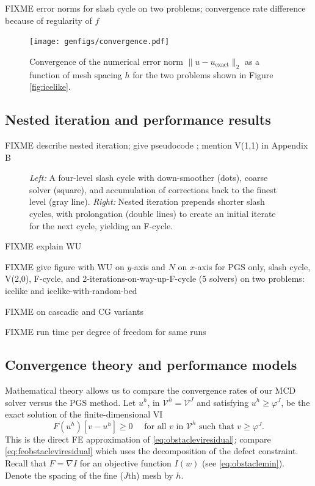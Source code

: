 \documentclass[letterpaper,final,12pt,reqno]{amsart}
\theoremstyle{claim}
\newcommand{\grad}{\nabla}
\numberwithin{equation}{section}
\numberwithin{figure}{section}
\numberwithin{table}{section}
\numberwithin{theorem}{section}
\begin{document}
FIXME error norms for slash cycle on two problems; convergence rate difference because of regularity of $f$

\begin{figure}
\texttt{[image: genfigs/convergence.pdf]}
\caption{Convergence of the numerical error norm $\|u-u_{\text{exact}}\|_2$ as a function of mesh spacing $h$ for the two problems shown in Figure \ref{fig:icelike}.}
\label{fig:convergence}
\end{figure}


\subsection*{Nested iteration and performance results} FIXME describe nested iteration; give pseudocode ; mention V(1,1) in Appendix B

\begin{figure}

\caption{\emph{Left:} A four-level slash cycle with down-smoother (dots), coarse solver (square), and accumulation of corrections back to the finest level (gray line).  \emph{Right:} Nested iteration prepends shorter slash cycles, with prolongation (double lines) to create an initial iterate for the next cycle, yielding an F-cycle.}
\label{fig:fcycle}
\end{figure}

FIXME explain WU

FIXME give figure with WU on $y$-axis and $N$ on $x$-axis for PGS only, slash cycle, V(2,0), F-cycle, and 2-iterations-on-way-up-F-cycle (5 solvers) on two problems: icelike and icelike-with-random-bed

FIXME \cite{Blumetal2004} on cascadic and CG variants

FIXME run time per degree of freedom for same runs

\subsection*{Convergence theory and performance models}  Mathematical theory allows us to compare the convergence rates of our MCD solver versus the PGS method.  Let $u^h$, in $\mathcal{V}^h = \mathcal{V}^J$ and satisfying $u^h \ge \varphi^J$, be the exact solution of the finite-dimensional VI
\begin{equation}
  F(u^h)[v-u^h] \ge 0 \quad \text{ for all } v \text{ in $\mathcal{V}^h$ such that } v \ge \varphi^J. \label{eq:feobstaclevioriginal}
\end{equation}
This is the direct FE approximation of \eqref{eq:obstacleviresidual}; compare \eqref{eq:feobstacleviresidual} which uses the decomposition of the defect constraint.  Recall that $F=\grad I$ for an objective function $I(w)$ (see \eqref{eq:obstaclemin}).  Denote the spacing of the fine ($J$th) mesh by $h$.
\end{document}
